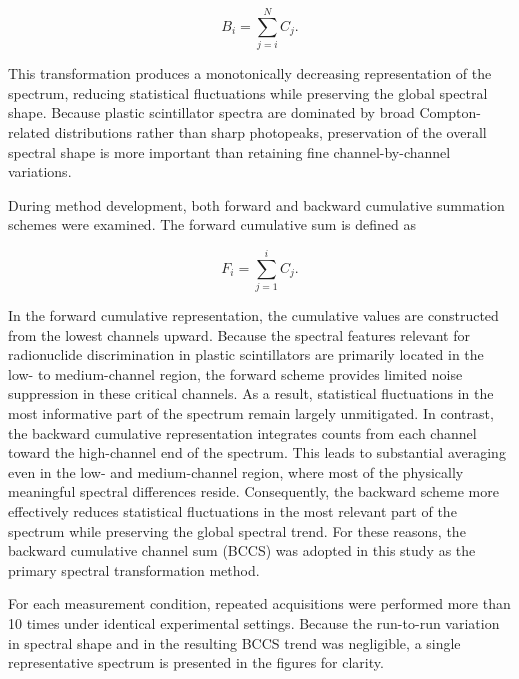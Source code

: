 \documentclass[10pt]{wlscirep}
\begin{document}
\begin{equation}
B_i = \sum_{j=i}^N C_j. \label{eq:BCCS}
\end{equation}

This transformation produces a monotonically decreasing representation of the spectrum, reducing statistical fluctuations while preserving the global spectral shape. Because plastic scintillator spectra are dominated by broad Compton-related distributions rather than sharp photopeaks, preservation of the overall spectral shape is more important than retaining fine channel-by-channel variations.


During method development, both forward and backward cumulative summation schemes were examined. The forward cumulative sum is defined as

$$
F_i = \sum_{j=1}^i C_j. \label{eq_FCCS}
$$

In the forward cumulative representation, the cumulative values are constructed from the lowest channels upward. Because the spectral features relevant for radionuclide discrimination in plastic scintillators are primarily located in the low- to medium-channel region, the forward scheme provides limited noise suppression in these critical channels. As a result, statistical fluctuations in the most informative part of the spectrum remain largely unmitigated.
In contrast, the backward cumulative representation integrates counts from each channel toward the high-channel end of the spectrum. This leads to substantial averaging even in the low- and medium-channel region, where most of the physically meaningful spectral differences reside. Consequently, the backward scheme more effectively reduces statistical fluctuations in the most relevant part of the spectrum while preserving the global spectral trend.
For these reasons, the backward cumulative channel sum (BCCS) was adopted in this study as the primary spectral transformation method.
\normalcolor

For each measurement condition, repeated acquisitions were performed more than 10 times under identical experimental settings. Because the run-to-run variation in spectral shape and in the resulting BCCS trend was negligible, a single representative spectrum is presented in the figures for clarity.

\end{document}
